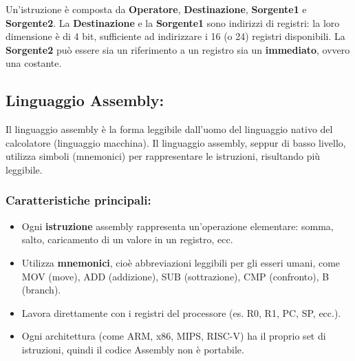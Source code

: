 \documentclass[8pt]{article}
\begin{document}
\vspace{0.5cm}
\noindent Un’istruzione è composta da \textbf{Operatore}, \textbf{Destinazione}, \textbf{Sorgente1} e \textbf{Sorgente2}. 
La \textbf{Destinazione} e la \textbf{Sorgente1} sono indirizzi di registri: la loro dimensione è di 4 bit, 
sufficiente ad indirizzare i 16 (o 24) registri disponibili. 
La \textbf{Sorgente2} può essere sia un riferimento a un registro sia un \textbf{immediato}, ovvero una costante.

\subsection{\Large Linguaggio Assembly:}

\vspace{0.2cm}
Il linguaggio assembly è la forma leggibile dall'uomo del linguaggio nativo del calcolatore (linguaggio macchina).
Il linguaggio assembly, seppur di basso livello, utilizza simboli (mnemonici) per rappresentare le istruzioni, risultando più leggibile. 

\subsubsection{{\fontsize{12pt}{12pt}\selectfont Caratteristiche principali:}}
\vspace{0.2cm}
\begin{itemize}[left=1em, itemsep=0.5em]
    \item Ogni \textbf{istruzione} assembly rappresenta un’operazione elementare: somma, salto, caricamento di un valore in un registro, ecc.
    \item Utilizza \textbf{mnemonici}, cioè abbreviazioni leggibili per gli esseri umani, come MOV (move), ADD (addizione), SUB (sottrazione), CMP (confronto), B
(branch).
    \item Lavora direttamente con i registri del processore (es. R0, R1, PC, SP, ecc.).
    \item Ogni architettura (come ARM, x86, MIPS, RISC-V) ha il proprio set di istruzioni, quindi il codice Assembly non è portabile.
\end{itemize}
\end{document}
